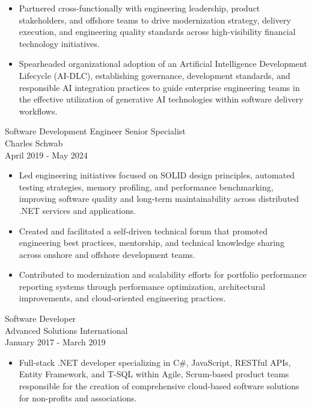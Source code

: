 \documentclass[11pt]{res}
\begin{document}
\begin{resume}
\begin{itemize}
\item Partnered cross-functionally with engineering leadership, product stakeholders, and offshore teams to drive modernization strategy, delivery execution, and engineering quality standards across high-visibility financial technology initiatives.

\item Spearheaded organizational adoption of an Artificial Intelligence Development Lifecycle (AI-DLC), establishing governance, development standards, and responsible AI integration practices to guide enterprise engineering teams in the effective utilization of generative AI technologies within software delivery workflows.

\end{itemize}

Software Development Engineer Senior Specialist \\
Charles Schwab \\
April 2019 - May 2024
\vspace{0.08in}

\begin{itemize} \itemsep -2pt

\item Led engineering initiatives focused on SOLID design principles, automated testing strategies, memory profiling, and performance benchmarking, improving software quality and long-term maintainability across distributed .NET services and applications.

\item Created and facilitated a self-driven technical forum that promoted engineering best practices, mentorship, and technical knowledge sharing across onshore and offshore development teams.

\item Contributed to modernization and scalability efforts for portfolio performance reporting systems through performance optimization, architectural improvements, and cloud-oriented engineering practices.

\end{itemize}

Software Developer \\
Advanced Solutions International \\
January 2017 - March 2019
\vspace{0.08in}

\begin{itemize} \itemsep -2pt

\item Full-stack .NET developer specializing in C\#, JavaScript, RESTful APIs, Entity Framework, and T-SQL within Agile, Scrum-based product teams responsible for the creation of comprehensive cloud-based software solutions for non-profits and associations.


\end{itemize}
\end{resume}
\end{document}
